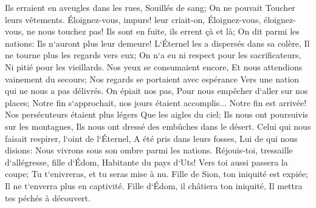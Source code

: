 \verse Ils erraient en aveugles dans les rues, Souillés de sang; On ne pouvait Toucher leurs vêtements. 
\verse Éloignez-vous, impurs! leur criait-on, Éloignez-vous, éloignez-vous, ne nous touchez pas! Ils sont en fuite, ils errent çà et là; On dit parmi les nations: Ils n`auront plus leur demeure! 
\verse L`Éternel les a dispersés dans sa colère, Il ne tourne plus les regards vers eux; On n`a eu ni respect pour les sacrificateurs, Ni pitié pour les vieillards. 
\verse Nos yeux se consumaient encore, Et nous attendions vainement du secours; Nos regards se portaient avec espérance Vers une nation qui ne nous a pas délivrés. 
\verse On épiait nos pas, Pour nous empêcher d`aller sur nos places; Notre fin s`approchait, nos jours étaient accomplis... Notre fin est arrivée! 
\verse Nos persécuteurs étaient plus légers Que les aigles du ciel; Ils nous ont poursuivis sur les montagnes, Ils nous ont dressé des embûches dans le désert. 
\verse Celui qui nous faisait respirer, l`oint de l`Éternel, A été pris dans leurs fosses, Lui de qui nous disions: Nous vivrons sous son ombre parmi les nations. 
\verse Réjouis-toi, tressaille d`allégresse, fille d`Édom, Habitante du pays d`Uts! Vers toi aussi passera la coupe; Tu t`enivreras, et tu seras mise à nu. 
\verse Fille de Sion, ton iniquité est expiée; Il ne t`enverra plus en captivité. Fille d`Édom, il châtiera ton iniquité, Il mettra tes péchés à découvert. 

